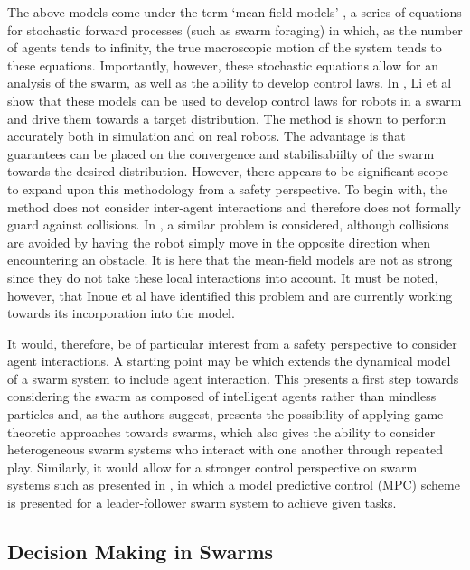 \documentclass[.../main.tex]{subfiles}
\begin{document}
The above models come under the term ‘mean-field models’ \cite{Elamvazhuthi2019b}, a series of
equations for stochastic forward processes (such as swarm foraging) in which, as the number of
agents tends to infinity, the true macroscopic motion of the system tends to these equations.
Importantly, however, these stochastic equations allow for an analysis of the swarm, as well as the
ability to develop control laws. In \cite{Li2017}, Li et al show that these models can be used to
develop control laws for robots in a swarm and drive them towards a target distribution. The method
is shown to perform accurately both in simulation and on real robots. The advantage is that
guarantees can be placed on the convergence and stabilisabiilty of the swarm towards the desired
distribution. However, there appears to be significant scope to expand upon this methodology from a
safety perspective. To begin with, the method does not consider inter-agent interactions and
therefore does not formally guard against collisions. In \cite{Inoue2019}, a similar problem is
considered, although collisions are avoided by having the robot simply move in the opposite
direction when encountering an obstacle. It is here that the mean-field models are not as strong
since they do not take these local interactions into account. It must be noted, however, that Inoue
et al have identified this problem and are currently working towards its incorporation into the
model.

It would, therefore, be of particular interest from a safety perspective to consider agent
interactions. A starting point may be \cite{Bellomo2017} which extends the dynamical model of a
swarm system to include agent interaction. This presents a first step towards considering the swarm
as composed of intelligent agents rather than mindless particles and, as the authors suggest,
presents the possibility of applying game theoretic approaches towards swarms, which also gives the
ability to consider heterogeneous swarm systems who interact with one another through repeated play.
Similarly, it would allow for a stronger control perspective on swarm systems such as presented in
\cite{Borzi2015}, in which a model predictive control (MPC) scheme is presented for a
leader-follower swarm system to achieve given tasks. 


\subsection{Decision Making in Swarms} \label{sec::Decisions_in_Swarms}
\end{document}
